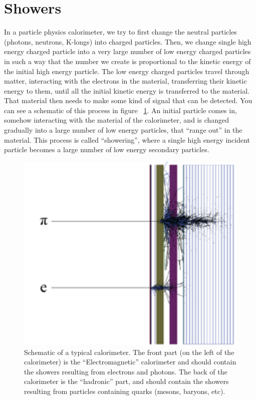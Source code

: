\section{Showers}

\noindent
In a particle physics calorimeter, we try to first change the neutral particles (photons, neutrons, K-longs) into charged particles. Then, we change single high energy charged particle into a very large number of low energy charged particles in such a way that the number we create is proportional to the kinetic energy of the initial high energy particle. The low energy charged particles travel through matter, interacting with the electrons in the material, transferring their kinetic energy to them, until all the initial kinetic energy is transferred to the material. That material then needs to make some kind of signal that can be detected. You can see a schematic of this process in figure ~\ref{fig:cal1}. An initial particle comes in, somehow interacting with the material of the calorimeter, and is changed gradually into a large number of low energy particles, that ``range out'' in the material. This process is called ``showering'',
where a single high energy incident particle becomes a large
number of low energy {\color{red} secondary} particles.

\;
\;

\begin{figure}[h]
\centering\includegraphics[scale=1.0]{./calorimetry/Pictures/fig1.pdf}
\caption{Schematic of a typical calorimeter. The front part (on the left of the calorimeter) is the ``Electromagnetic'' calorimeter and should contain the showers resulting from electrons and photons. The back of the calorimeter is the ``hadronic'' part, and should contain the showers resulting from particles containing quarks (mesons, baryons, etc).}
\label{fig:cal1}
\end{figure}

